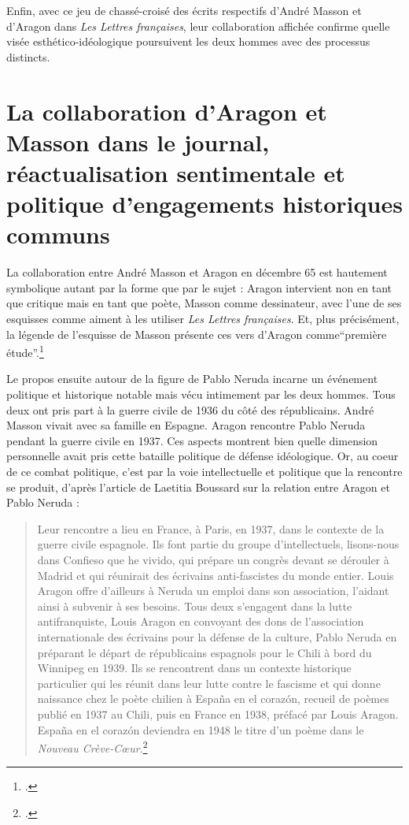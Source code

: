 	Enfin, avec ce jeu de chassé-croisé des écrits respectifs d’André Masson et d’Aragon dans \emph{Les Lettres françaises}, leur collaboration affichée confirme quelle visée esthético-idéologique poursuivent les deux hommes avec des processus distincts.

\section{La collaboration d’Aragon et Masson dans le journal, réactualisation sentimentale et politique d’engagements historiques communs}

La collaboration entre André Masson et Aragon en décembre 65 est hautement symbolique autant par la forme que par le sujet : Aragon intervient non en tant que critique mais en tant que poète, Masson comme dessinateur, avec l’une de ses esquisses comme aiment à les utiliser \emph{Les Lettres françaises}. Et, plus précisément, la légende de l’esquisse de Masson présente ces vers d’Aragon comme\enquote{première étude}.\footcite{pabloneruda}

	 Le propos ensuite autour de la figure de Pablo Neruda incarne un événement politique et historique notable mais vécu intimement par les deux hommes. Tous deux ont pris part à la guerre civile de 1936 du côté des républicains. André Masson vivait avec sa famille en Espagne. Aragon rencontre Pablo Neruda pendant la guerre civile en 1937. Ces aspects montrent bien quelle dimension personnelle avait pris cette bataille politique de défense idéologique. Or, au coeur de ce combat politique, c’est par la voie intellectuelle et politique que la rencontre se produit, d’après l’article de Laetitia Boussard sur la relation entre Aragon et Pablo Neruda :


\begin{quote}
Leur rencontre a lieu en France, à Paris, en 1937, dans le contexte de la guerre civile espagnole. Ils font partie du groupe d’intellectuels, lisons-nous dans Confieso que he vivido, qui prépare un congrès devant se dérouler à Madrid et qui réunirait des écrivains anti-fascistes du monde entier. Louis Aragon offre d’ailleurs à Neruda un emploi dans son association, l’aidant ainsi à subvenir à ses besoins. Tous deux s’engagent dans la lutte antifranquiste, Louis Aragon en convoyant des dons de l’association internationale des écrivains pour la défense de la culture, Pablo Neruda en préparant le départ de républicains espagnols pour le Chili à bord du Winnipeg en 1939. Ils se rencontrent dans un contexte historique particulier qui les réunit dans leur lutte contre le fascisme et qui donne naissance chez le poète chilien à España en el corazón, recueil de poèmes publié en 1937 au Chili, puis en France en 1938, préfacé par Louis Aragon. España en el corazón deviendra en 1948 le titre d’un poème dans le \emph{Nouveau Crève-Cœur}.\footcite{aragonaneruda}\end{quote}	 

